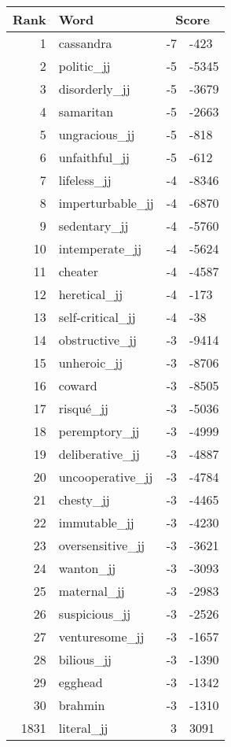 \begin{longtable}[!htbp]{| rlr@{.}l |}
    \hline
    \textbf{Rank} & \textbf{Word} & \multicolumn{2}{c|}{\textbf{Score}} \\
    \hline
    \endhead
    1 & cassandra & -7 & -423 \\
    2 & politic\_jj & -5 & -5345 \\
    3 & disorderly\_jj & -5 & -3679 \\
    4 & samaritan & -5 & -2663 \\
    5 & ungracious\_jj & -5 & -818 \\
    6 & unfaithful\_jj & -5 & -612 \\
    7 & lifeless\_jj & -4 & -8346 \\
    8 & imperturbable\_jj & -4 & -6870 \\
    9 & sedentary\_jj & -4 & -5760 \\
    10 & intemperate\_jj & -4 & -5624 \\
    11 & cheater & -4 & -4587 \\
    12 & heretical\_jj & -4 & -173 \\
    13 & self-critical\_jj & -4 & -38 \\
    14 & obstructive\_jj & -3 & -9414 \\
    15 & unheroic\_jj & -3 & -8706 \\
    16 & coward & -3 & -8505 \\
    17 & risqué\_jj & -3 & -5036 \\
    18 & peremptory\_jj & -3 & -4999 \\
    19 & deliberative\_jj & -3 & -4887 \\
    20 & uncooperative\_jj & -3 & -4784 \\
    21 & chesty\_jj & -3 & -4465 \\
    22 & immutable\_jj & -3 & -4230 \\
    23 & oversensitive\_jj & -3 & -3621 \\
    24 & wanton\_jj & -3 & -3093 \\
    25 & maternal\_jj & -3 & -2983 \\
    26 & suspicious\_jj & -3 & -2526 \\
    27 & venturesome\_jj & -3 & -1657 \\
    28 & bilious\_jj & -3 & -1390 \\
    29 & egghead & -3 & -1342 \\
    30 & brahmin & -3 & -1310 \\
    1831 & literal\_jj & 3 & 3091 \\

\end{longtable}
